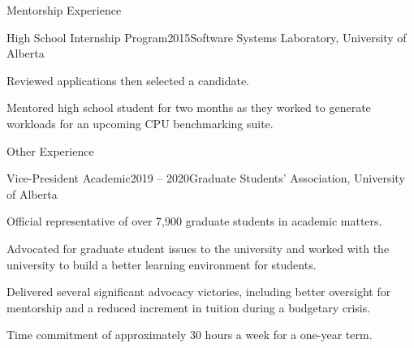 \documentclass{cv}
\begin{document}

\begin{rSection}{Mentorship Experience}

\begin{rSubsection}{High School Internship Program}{2015}{Software Systems Laboratory, University of Alberta}
\item Reviewed applications then selected a candidate.
\item Mentored high school student for two months as they worked to generate workloads for an upcoming CPU benchmarking suite.
\end{rSubsection}

\end{rSection}


\begin{rSection}{Other Experience}

\begin{rSubsection}{Vice-President Academic}{2019 -- 2020}{Graduate Students' Association, University of Alberta}
\item Official representative of over 7,900 graduate students in academic matters.
\item Advocated for graduate student issues to the university and worked with the university to build a better learning environment for students.
\item Delivered several significant advocacy victories, including better oversight for mentorship and a reduced increment in tuition during a budgetary crisis.
\item Time commitment of approximately 30 hours a week for a one-year term.
\end{rSubsection}

\end{rSection}

\end{document}
